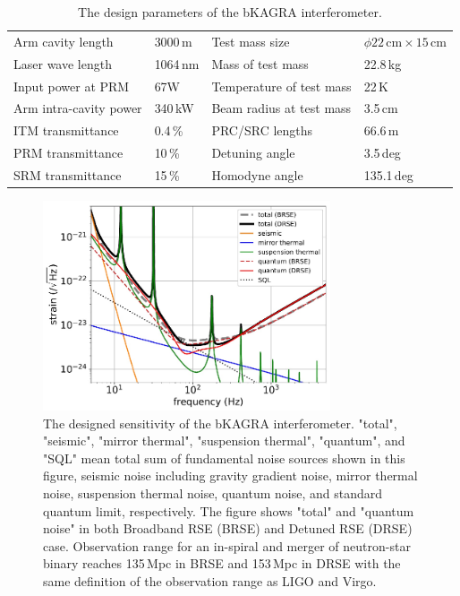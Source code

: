 \begin{table} 
\begin{center} 
 \caption{\label{table:design_para}The design parameters of the bKAGRA interferometer\cite{phase1_paper}.}
 \begin{tabular}{llll}
  \hline
 Arm cavity length & 3000\,m & Test mass size & $\phi 22\,\mathrm{cm} \times 15\,\mathrm{cm}$ \\
Laser wave length & 1064\,nm & Mass of test mass & 22.8\,kg \\
Input power at PRM & 67W & Temperature of test mass & 22\,K \\
Arm intra-cavity power & 340\,kW & Beam radius at test mass & 3.5\,cm\\ 
ITM transmittance & 0.4\,\% & PRC/SRC lengths & 66.6\,m\\ 
PRM transmittance & 10\,\% & Detuning angle & 3.5\,deg\\  
SRM transmittance & 15\,\% & Homodyne angle & 135.1\,deg\\  \hline
\end{tabular}
\end{center} 
 \end{table}






\begin{figure}
\begin{center}
\includegraphics[width=8.5cm]{astrodiv/gw/overview/fig/kagra_sensitivity.eps}
\caption{The designed sensitivity of the bKAGRA interferometer\cite{phase1_paper}. "total", "seismic", "mirror thermal", "suspension thermal", "quantum", and "SQL" mean total sum of fundamental noise sources shown in this figure, seismic noise including gravity gradient noise, mirror thermal noise, suspension thermal noise, quantum noise, and standard quantum limit, respectively. The figure shows "total" and "quantum noise" in both Broadband RSE (BRSE) and Detuned RSE (DRSE) case. Observation range for an in-spiral and merger of neutron-star binary reaches 135\,Mpc in BRSE and 153\,Mpc in DRSE with the same definition of the observation range as LIGO and Virgo.}
\label{fig:kagra-sensitivity}
\end{center}
\end{figure}


